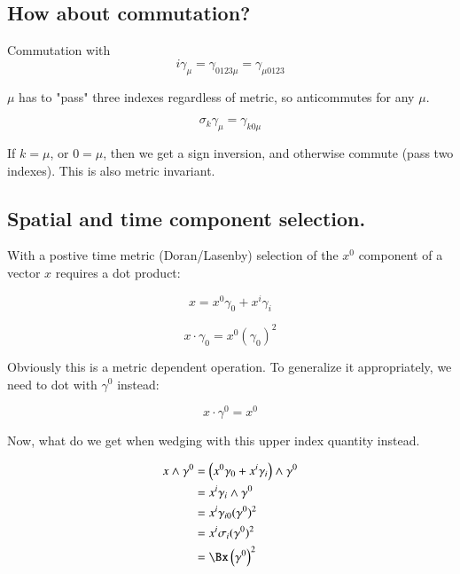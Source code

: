 \documentclass{article}
\begin{document}
\subsection{ How about commutation? }

Commutation with
\begin{equation*}
i \gamma_{\mu} = \gamma_{0123\mu} = \gamma_{\mu0123}
\end{equation*}

$\mu$ has to "pass" three indexes regardless of metric, so anticommutes for any $\mu$.

\begin{equation*}
\sigma_k \gamma_{\mu} = \gamma_{k0\mu}
\end{equation*}

If $k = \mu$, or $0 = \mu$, then we get a sign inversion, and otherwise commute (pass two indexes).  This is also metric invariant.

\subsection{ Spatial and time component selection. }

With a postive time metric (Doran/Lasenby) selection of the $x^0$ component of a vector $x$ requires a dot product:

\begin{equation*}
x = x^0 \gamma_0 + x^i \gamma_i
\end{equation*}

\begin{equation*}
x \cdot \gamma_0 = x^0 (\gamma_0)^2
\end{equation*}

Obviously this is a metric dependent operation.  To generalize it appropriately, we need to dot with $\gamma^0$ instead:

\begin{equation*}
x \cdot \gamma^0 = x^0
\end{equation*}

Now, what do we get when wedging with this upper index quantity instead.

\begin{align*}
x \wedge \gamma^0
&= \left(x^0 \gamma_0 + x^i \gamma_i\right) \wedge \gamma^0 \\
&= x^i \gamma_i \wedge \gamma^0 \\
&= x^i \gamma_{i0} (\gamma^0)^2 \\
&= x^i \sigma_i (\gamma^0)^2 \\
&= \Bx \left(\gamma^0\right)^2
\end{align*}
\end{document}
